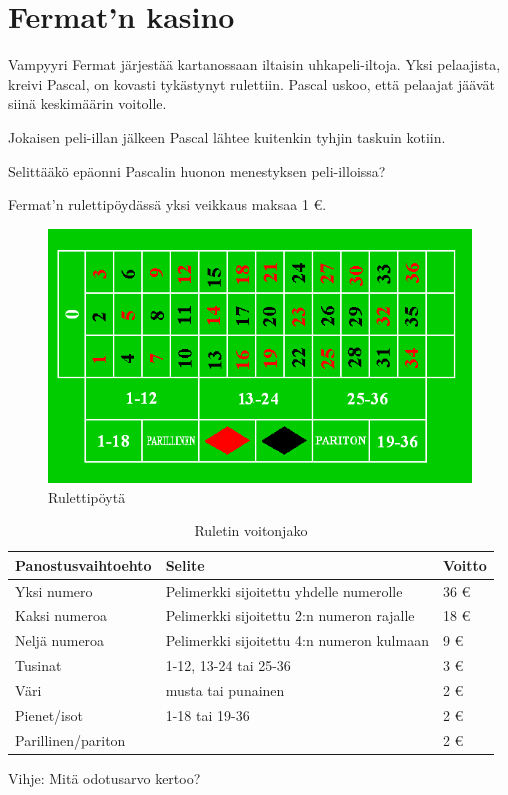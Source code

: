 \clearpage

\section{Fermat’n kasino}

Vampyyri Fermat järjestää kartanossaan iltaisin uhkapeli-iltoja. Yksi pelaajista, kreivi Pascal, on kovasti tykästynyt rulettiin. Pascal uskoo, että pelaajat jäävät siinä keskimäärin voitolle.


Jokaisen peli-illan jälkeen Pascal lähtee kuitenkin tyhjin taskuin kotiin. 


Selittääkö epäonni Pascalin huonon menestyksen peli-illoissa?


Fermat’n rulettipöydässä yksi veikkaus maksaa 1 €.


\begin{figure}[h]
    \begin{center}
    \includegraphics[width=0.8\linewidth]{kuvat/ruletti.png}
    \caption*{Rulettipöytä}
    \end{center}
\end{figure}

\begin{table}[h]
  \centering
    \begin{tabular}{| l | l | l |}
    \hline
    Panostusvaihtoehto & Selite & Voitto \\
    \hline
    Yksi numero & Pelimerkki sijoitettu yhdelle numerolle & 36 € \\
    Kaksi numeroa & Pelimerkki sijoitettu 2:n numeron rajalle & 18 € \\
    Neljä numeroa & Pelimerkki sijoitettu 4:n numeron kulmaan & 9 € \\
    \hline
    Tusinat & 1-12, 13-24 tai 25-36 & 3 € \\
    Väri & musta tai punainen & 2 € \\
    Pienet/isot & 1-18 tai 19-36 & 2 € \\
    Parillinen/pariton & & 2 € \\
    \hline
    \end{tabular}
  \caption*{Ruletin voitonjako}
\end{table}

Vihje: Mitä odotusarvo kertoo?
